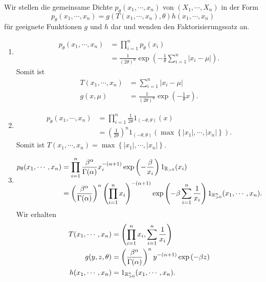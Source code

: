 \solution 
Wir stellen die gemeinsame Dichte $p_\theta(x_1, \cdots, x_n)$ von $(X_1, \cdots, X_n)$ in der Form
\begin{equation*}
    p_{\theta} (x_1, \cdots, x_n) = g(T(x_1, \cdots, x_n), \theta) h(x_1, \cdots, x_n)
\end{equation*}
für geeignete Funktionen $g$ und $h$ dar und wenden den Faktorisierungssatz an. 
\begin{enumerate}
    \item \begin{align*}
            p_\theta(x_1, \cdots, x_n) &= \prod_{i=1}^{n} p_\theta(x_i) \\
            &= \frac{1}{ (2\theta)^n} \exp \left( - \frac{1}{\theta} \sum_{i=1}^{n} | x_i - \mu | \right). 
        \end{align*}
        Somit ist 
        \begin{align*}
            T(x_1, \cdots, x_n) &= \sum_{i=1}^{n} | x_i - \mu | \\
            g(x, \mu)  &= \frac{1}{ (2\theta)^n} \exp \left( - \frac{1}{\theta} x \right).
        \end{align*}
    \item \begin{align*}
            p_\theta(x_1, \cdots, x_n) &= \prod_{i=1}^{n} \frac{1}{2\theta} 1_{\left( -\theta ,\theta \right)}(x) \\
            &= \left( \frac{1}{2\theta} \right)^n 1_{(-\theta, \theta)} ( \max \left\{  |x_1|, \cdots, |x_n| \right\}).
        \end{align*}
        Somit ist $T(x_1, \cdots, x_n) = \max \left\{  |x_1|, \cdots, |x_n| \right\}$. 
    \item \begin{align*}
            p_\theta(x_1, \cdots, x_n) &= \prod_{i=1}^{n} 
            \frac{\beta^\alpha}{\Gamma(\alpha)} x_i^{- (\alpha+1)} 
            \exp\left(  -\frac{\beta}{x_i} \right) 1_{\mathbb R_{>0}}(x_i) \\
            &= \left( \frac{\beta^\alpha}{\Gamma(\alpha)} \right)^n 
            \left( \prod_{i=1}^n x_i \right)^{-\left( \alpha+1 \right)}
            \exp \left( -\beta \sum_{i=1}^{n} \frac{1}{x_i} \right) 1_{ \mathbb R_{>0}^n} (x_1, \cdots, x_n).
        \end{align*}
        Wir erhalten
        \begin{align*}
            T(x_1, \cdots, x_n) &= \left( \prod_{i=1}^n x_i, \sum_{i=1}^{n} \frac{1}{x_i} \right) \\
            g(y,z, \theta) &= \left( \frac{\beta^\alpha}{\Gamma(\alpha)} \right)^n 
            y^{-\left( \alpha+1 \right)} \exp \left( -\beta z \right) \\
            h(x_1, \cdots, x_n) &= 1_{ \mathbb R_{>0}^n} (x_1, \cdots, x_n).
        \end{align*}
\end{enumerate}




